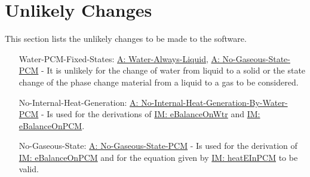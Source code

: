 \documentclass[12pt]{article}
\begin{document}
\section{Unlikely Changes}
\label{Sec:UCs}
This section lists the unlikely changes to be made to the software.
\begin{itemize}
\item[Water-PCM-Fixed-States:\phantomsection\label{unlikeChgWPFS}]\hyperref[assumpWAL]{A: Water-Always-Liquid}, \hyperref[assumpNGSP]{A: No-Gaseous-State-PCM} - It is unlikely for the change of water from liquid to a solid or the state change of the phase change material from a liquid to a gas to be considered.
\item[No-Internal-Heat-Generation:\phantomsection\label{unlikeChgNIHG}]\hyperref[assumpNIHGBWP]{A: No-Internal-Heat-Generation-By-Water-PCM} - Is used for the derivations of \hyperref[IM:eBalanceOnWtr]{IM: eBalanceOnWtr} and \hyperref[IM:eBalanceOnPCM]{IM: eBalanceOnPCM}.
\item[No-Gaseous-State:\phantomsection\label{unlikeChgNGS}]\hyperref[assumpNGSP]{A: No-Gaseous-State-PCM} - Is used for the derivation of \hyperref[IM:eBalanceOnPCM]{IM: eBalanceOnPCM} and for the equation given by \hyperref[IM:heatEInPCM]{IM: heatEInPCM} to be valid.
\end{itemize}
\end{document}
